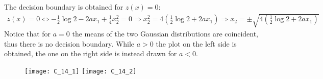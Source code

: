 The decision boundary is obtained for \(z(x)=0\):
\begin{align*}
    z(x)=0
    \Longleftrightarrow
    -\frac{1}{2}\log{2}-2ax_1+\frac{1}{4}x_2^2=0
    \Rightarrow
    x_2^2=4(\frac{1}{2}\log{2}+2ax_1)
    \Rightarrow
    x_2=\pm\sqrt{4(\frac{1}{2}\log{2}+2ax_1)}
\end{align*}
Notice that for \(a=0\) the means of the two Gaussian distributions are
coincident, thus there is no decision boundary. While \(a>0\) the plot
on the left side is obtained, the one on the right side is instead
drawn for \(a<0\).
\begin{figure}[H]
    \texttt{[image: C\_14\_1]}
    \hspace{1cm}
    \texttt{[image: C\_14\_2]}
    \centering
\end{figure}